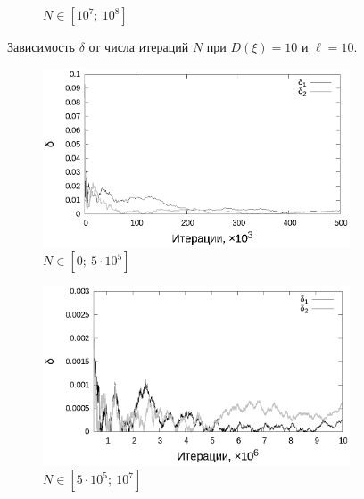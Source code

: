 \documentclass[11pt,a4paper]{article}
\theoremstyle{definition}
\begin{document}
\begin{figure}[h!]
\begin{subfigure}[b]{0.3\textwidth}
    \caption{$N \in [10^7;~10^8]$}
    \label{fig:classic_var10_n10_end}
  \end{subfigure}
  \caption{Зависимость $\delta$ от числа итераций $N$ при $D(\xi) = 10$ и $\ell = 10$.}
  \label{fig:classic_var10_n10}
\end{figure}

\begin{figure}[h!]
  \begin{subfigure}[b]{0.3\textwidth}
    \includegraphics[width=\textwidth]{figs/classic/linear_log_10x_3_samples_10_variance_1_norm.log_0_500.eps}
    \caption{$N \in [0;~5 \cdot 10^5]$}
    \label{fig:classic_var1_n10_begin}
  \end{subfigure}
  \begin{subfigure}[b]{0.3\textwidth}
    \includegraphics[width=\textwidth]{figs/classic/linear_log_10x_3_samples_10_variance_1_norm.log_500_10000.eps}
    \caption{$N \in [5 \cdot 10^5;~10^7]$}
    \label{fig:classic_var1_n10_middle}
  \end{subfigure}
  \begin{subfigure}[b]{0.3\textwidth}

\end{subfigure}
\end{figure}
\end{document}

